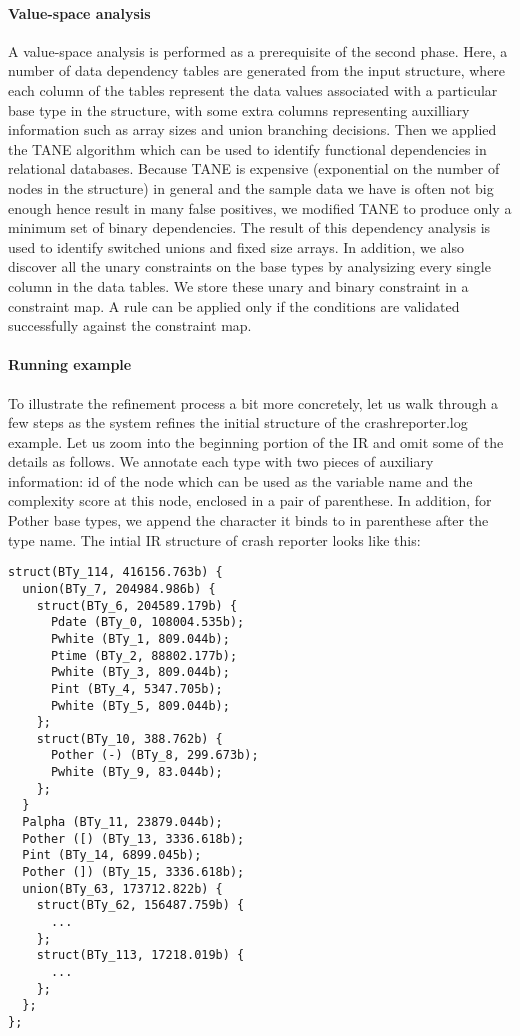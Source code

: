 \paragraph*{Value-space analysis}
A value-space analysis is performed as a prerequisite of the second phase.
Here, a number of data dependency tables are generated from the 
input structure, where each
column of the tables represent the data values associated with a particular base type 
in the structure, with some extra columns representing auxilliary information such as
array sizes and union branching decisions. Then we applied the TANE algorithm \cite{TANE-HKPT99}
which can be used to identify functional dependencies in relational databases.
Because TANE is expensive (exponential on the number of nodes in the structure) 
in general and the sample data we have is often not big enough hence 
result in many false positives, we modified TANE to produce only a minimum set 
of binary dependencies. The result of this dependency analysis is used to 
identify switched unions and fixed size arrays.
In addition, we also discover all the unary constraints on the base types by
analysizing every single column in the data tables. We store these unary and
binary constraint in a constraint map.  A rule can be applied 
only if the conditions are validated successfully
against the constraint map. 

\paragraph*{Running example}
To illustrate the refinement process a bit more concretely, let us walk through
a few steps as the system refines the initial structure of the crashreporter.log example.
Let us zoom into the beginning portion of the IR and omit some of the details as follows. 
We annotate each type with two pieces of auxiliary information: id of the node which
can be used as the variable name and the complexity score at this node, 
enclosed in a pair of parenthese. In addition, for Pother base types,
we append the character it binds to in parenthese after the type name.
The intial IR structure of crash reporter looks like this:

{\small
\begin{verbatim}
struct(BTy_114, 416156.763b) {
  union(BTy_7, 204984.986b) {
    struct(BTy_6, 204589.179b) {
      Pdate (BTy_0, 108004.535b);
      Pwhite (BTy_1, 809.044b);
      Ptime (BTy_2, 88802.177b);
      Pwhite (BTy_3, 809.044b);
      Pint (BTy_4, 5347.705b);
      Pwhite (BTy_5, 809.044b);
    };
    struct(BTy_10, 388.762b) {
      Pother (-) (BTy_8, 299.673b);
      Pwhite (BTy_9, 83.044b);
    };
  }
  Palpha (BTy_11, 23879.044b);
  Pother ([) (BTy_13, 3336.618b);
  Pint (BTy_14, 6899.045b);
  Pother (]) (BTy_15, 3336.618b);
  union(BTy_63, 173712.822b) {
    struct(BTy_62, 156487.759b) {
      ...
    };
    struct(BTy_113, 17218.019b) {
      ...
    };
  };
};
\end{verbatim}
}

